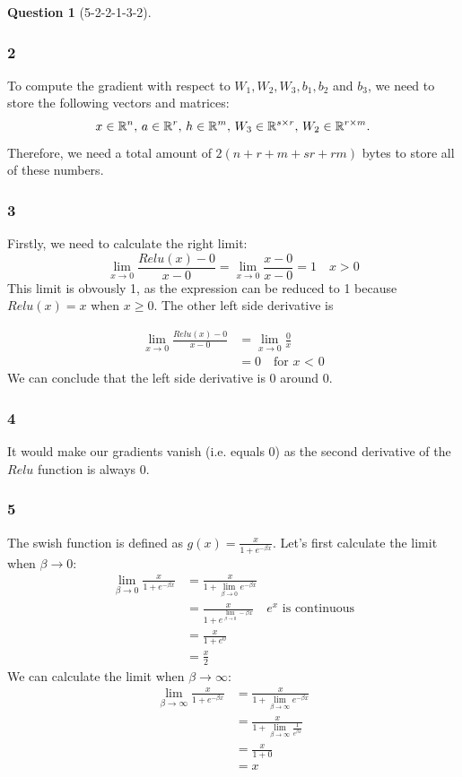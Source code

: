 \documentclass[12pt]{article}
\theoremstyle{definition}
\newtheorem{exercise}{Question}%
\begin{document}
\begin{exercise}[5-2-2-1-3-2]
{\subsubsection*{2}
  To compute the gradient with respect to $W_{1}, W_{2}, W_{3}, b_{1}, b_{2}$ and
  $b_{3}$, we need to store the following vectors and matrices:
  \begin{equation*}
    x \in \mathbb{R}^{n}, \, a \in \mathbb{R}^{r}, \, h \in \mathbb{R}^{m}, \,W_{3} \in \mathbb{R}^{s \times r}, \, W_{2} \in \mathbb{R}^{r \times m}.
  \end{equation*}Therefore, we need a total amount of $2(n+r+m+sr+rm)$ bytes to
  store all of these numbers.
\subsubsection*{3}
Firstly, we need to calculate the right limit:
\begin{equation*}
  \lim_{x\to0} \frac{ Relu(x)-0 }{x-0} = \lim_{x\to0} \frac{ x-0 }{x-0} = 1 \quad x > 0
\end{equation*}This limit is obvously 1, as the expression can be reduced to 1
because $Relu(x) = x$ when $x\geq0$.
The other left side derivative is

\begin{align*}
  \lim_{x\to0} \frac{ Relu(x)-0 }{x-0} &= \lim_{x\to0} \frac{0}{x} \\
  &= 0 \quad \text{for $x$ < 0}
\end{align*}We can conclude that the left side derivative is 0 around 0.

}
\subsubsection*{4}It would make our gradients vanish (i.e. equals 0) as the second derivative of
the $Relu$ function is always $0$.
\subsubsection{5}
The swish function is defined as $g(x) = \frac{x}{1+e^{-\beta x}}$. Let's first
calculate the limit when $\beta \to 0$:
\begin{align*}
  \lim_{\beta \to 0} \frac{x}{1+e^{-\beta x}} &= \frac{x}{1+\lim_{\beta \to 0} e^{-\beta x}}\\
  &=  \frac{x}{1+ e^{\lim_{\beta \to 0}-\beta x}} \quad \text{$e^{x}$ is continuous}\\
  &=  \frac{x}{1+ e^{0}}\\
  &=  \frac{x}{2}
\end{align*}
We can calculate the limit when $\beta \to \infty$:
\begin{align*}
  \lim_{\beta \to \infty} \frac{x}{1+e^{-\beta x}} &= \frac{x}{1+\lim_{\beta \to \infty} e^{-\beta x}}\\
  &= \frac{x}{1+\lim_{\beta \to \infty} \frac{1}{e^{\beta x}}}\\
  &=  \frac{x}{1+ 0}\\
  &=  x
\end{align*}

\end{exercise}
\end{document}
